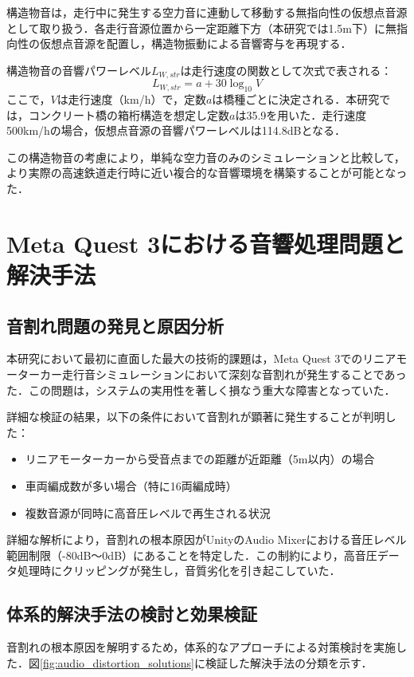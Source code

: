 \documentclass[10pt]{jsarticle}
\begin{document}
構造物音は，走行中に発生する空力音に連動して移動する無指向性の仮想点音源として取り扱う．各走行音源位置から一定距離下方（本研究では1.5m下）に無指向性の仮想点音源を配置し，構造物振動による音響寄与を再現する．

構造物音の音響パワーレベル$L_{W,str}$は走行速度の関数として次式で表される：
\begin{equation}
L_{W,str} = a + 30 \log_{10} V
\end{equation}
ここで，$V$は走行速度（km/h）で，定数$a$は橋種ごとに決定される．本研究では，コンクリート橋の箱桁構造を想定し定数$a$は35.9を用いた．走行速度500km/hの場合，仮想点音源の音響パワーレベルは114.8dBとなる．

この構造物音の考慮により，単純な空力音のみのシミュレーションと比較して，より実際の高速鉄道走行時に近い複合的な音響環境を構築することが可能となった．

\section{Meta Quest 3における音響処理問題と解決手法}
\subsection{音割れ問題の発見と原因分析}
本研究において最初に直面した最大の技術的課題は，Meta Quest 3でのリニアモーターカー走行音シミュレーションにおいて深刻な音割れが発生することであった．この問題は，システムの実用性を著しく損なう重大な障害となっていた．

詳細な検証の結果，以下の条件において音割れが顕著に発生することが判明した：
\begin{itemize}
\item リニアモーターカーから受音点までの距離が近距離（5m以内）の場合
\item 車両編成数が多い場合（特に16両編成時）
\item 複数音源が同時に高音圧レベルで再生される状況
\end{itemize}

詳細な解析により，音割れの根本原因がUnityのAudio Mixerにおける音圧レベル範囲制限（-80dB〜0dB）にあることを特定した．この制約により，高音圧データ処理時にクリッピングが発生し，音質劣化を引き起こしていた．

\subsection{体系的解決手法の検討と効果検証}
音割れの根本原因を解明するため，体系的なアプローチによる対策検討を実施した．図\ref{fig:audio_distortion_solutions}に検証した解決手法の分類を示す．
\end{document}

